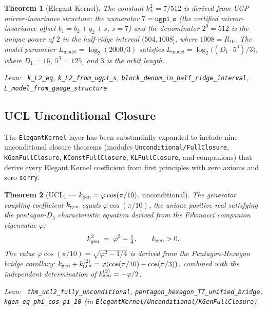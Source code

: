 \documentclass[11pt,a4paper]{article}
\newenvironment{leanref}%
  {\par\smallskip\noindent\begingroup\raggedright\textup{Lean:}~}%
  {\par\endgroup}
\newtheorem{theorem}{Theorem}[section]
\theoremstyle{definition}
\begin{document}
\begin{theorem}[Elegant Kernel]\label{thm:ek}
The constant $k_L^2 = 7/512$ is derived from UGP mirror-invariance structure:
the numerator $7 = \mathtt{ugp1\_s}$ (the certified mirror-invariance offset
$b_1 = b_2 + q_2 + s$, $s=7$) and the denominator $2^9 = 512$ is the unique
power of $2$ in the half-ridge interval $(504, 1008]$, where $1008 = R_{10}$.
The model parameter $L_{\mathrm{model}} = \log_2(2000/3)$ satisfies
$L_{\mathrm{model}} = \log_2\bigl((D_1 \cdot 5^3) / 3\bigr)$,
where $D_1 = 16$, $5^3 = 125$, and $3$ is the orbit length.

\begin{leanref} \lstinline|k_L2_eq|, \lstinline|k_L2_from_ugp1_s|,
\lstinline|block_denom_in_half_ridge_interval|,
\lstinline|L_model_from_gauge_structure|
\end{leanref}
\end{theorem}

\subsection{UCL Unconditional Closure}\label{subsec:ucl-unconditional}

The \texttt{ElegantKernel} layer has been substantially expanded to include
nine unconditional closure theorems (modules
\texttt{Unconditional/FullClosure}, \texttt{KGenFullClosure},
\texttt{KConstFullClosure}, \texttt{KLFullClosure}, and companions)
that derive every Elegant Kernel coefficient from first principles
with zero axioms and zero \texttt{sorry}.

\begin{theorem}[UCL$_1$ --- $k_{\rm gen} = \varphi\cos(\pi/10)$, unconditional]\label{thm:ucl1}
The generator coupling coefficient $k_{\rm gen}$ equals $\varphi\cos(\pi/10)$,
the unique positive real satisfying the pentagon-$D_5$ characteristic
equation derived from the Fibonacci companion eigenvalue $\varphi$:
\[
  k_{\rm gen}^2 \;=\; \varphi^2 - \tfrac{1}{4}, \qquad k_{\rm gen} > 0.
\]
The value $\varphi\cos(\pi/10) = \sqrt{\varphi^2 - 1/4}$ is derived from
the Pentagon-Hexagon bridge corollary:
$k_{\rm gen} + k_{\rm gen}^{(2)} = \varphi(\cos(\pi/10) - \cos(\pi/3))$,
combined with the independent determination of $k_{\rm gen}^{(2)} = -\varphi/2$.

\begin{leanref} \lstinline|thm_ucl2_fully_unconditional|,
\lstinline|pentagon_hexagon_TT_unified_bridge|,
\lstinline|kgen_eq_phi_cos_pi_10|
\textup{(in \texttt{ElegantKernel/Unconditional/KGenFullClosure})}
\end{leanref}
\end{theorem}
\end{document}
